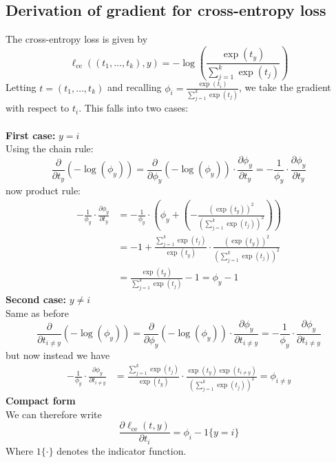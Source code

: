 \documentclass{report}
\begin{document}
\subsection{Derivation of gradient for cross-entropy loss}
The cross-entropy loss is given by
\begin{equation*}
\ell_{\text{ce}}((t_1,\ldots,t_k),y)=-\log\left(\frac{\exp(t_y)}{\sum^k_{j=1}\exp(t_j)}\right)
\end{equation*}
Letting $t=(t_1,\ldots,t_k)$ and recalling $\phi_i=\frac{\exp(t_i)}{\sum^k_{j=1}\exp(t_j)}$, 
we take the gradient with respect to $t_i$. This falls into two cases:\\
\vspace{1mm}\\
\textbf{First case:} $y=i$\\
Using the chain rule:
\begin{equation*}
\frac{\partial}{\partial t_y}(-\log(\phi_y))=
\frac{\partial}{\partial\phi_y}(-\log(\phi_y))\cdot
\frac{\partial\phi_y}{\partial t_y}=-\frac{1}{\phi_y}\cdot
\frac{\partial\phi_y}{\partial t_y}
\end{equation*}
now product rule:
\begin{align*}
-\frac{1}{\phi_y}\cdot\frac{\partial\phi_y}{\partial t_y}
&=-\frac{1}{\phi_y}\cdot\left(\phi_y+\left(-\frac{(\exp(t_y))^2}{\left(\sum^k_{j=1}\exp(t_j)\right)^2}\right)\right)
\\&=-1+\frac{\sum^k_{j=1}\exp(t_j)}{\exp(t_y)}\cdot\frac{(\exp(t_y))^2}{\left(\sum^k_{j=1}\exp(t_j)\right)^2}\\
&=\frac{\exp(t_y)}{\sum^k_{j=1}\exp(t_j)}-1=\phi_y-1
\end{align*}
\textbf{Second case:} $y\neq i$\\
Same as before
\begin{equation*}
\frac{\partial}{\partial t_{i\neq y}}(-\log(\phi_y))=
\frac{\partial}{\partial\phi_y}(-\log(\phi_y))\cdot
\frac{\partial\phi_y}{\partial t_{i\neq y}}=-\frac{1}{\phi_y}\cdot
\frac{\partial\phi_y}{\partial t_{i\neq y}}
\end{equation*}
but now instead we have
\begin{align*}
-\frac{1}{\phi_y}\cdot\frac{\partial\phi_y}{\partial t_{i\neq y}}&=
\frac{\sum^k_{j=1}\exp(t_j)}{\exp(t_y)}\cdot
\frac{\exp(t_y)\exp(t_{i\neq y})}{\left(\sum^k_{j=1}\exp(t_j)\right)^2}=\phi_{i\neq y}
\end{align*}
\textbf{Compact form}\\
We can therefore write
\begin{equation*}
\frac{\partial\ell_{\text{ce}}(t,y)}{\partial t_i}=\phi_i-1\{y=i\}
\end{equation*}
Where $1\{\cdot\}$ denotes the indicator function.
\newpage

\subsection{}
\end{document}
